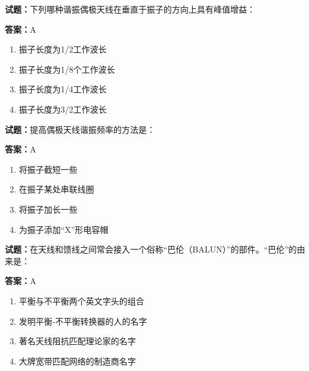 \documentclass{ctexbook}
\begin{document}




\vspace{1em}

\textbf{试题：}下列哪种谐振偶极天线在垂直于振子的方向上具有峰值增益： 

\textbf{答案：}A 

\begin{enumerate}[leftmargin=3em]
  \item 振子长度为1/2工作波长 

  \item 振子长度为1/8个工作波长 

  \item 振子长度为1/4工作波长 

  \item 振子长度为3/2工作波长 

\end{enumerate}





\vspace{1em}

\textbf{试题：}提高偶极天线谐振频率的方法是： 

\textbf{答案：}A 

\begin{enumerate}[leftmargin=3em]
  \item 将振子截短一些 

  \item 在振子某处串联线圈 

  \item 将振子加长一些 

  \item 为振子添加“X”形电容帽 

\end{enumerate}





\vspace{1em}

\textbf{试题：}在天线和馈线之间常会接入一个俗称“巴伦（BALUN）”的部件。“巴伦”的由来是： 

\textbf{答案：}A 

\begin{enumerate}[leftmargin=3em]
  \item 平衡与不平衡两个英文字头的组合 

  \item 发明平衡-不平衡转换器的人的名字 

  \item 著名天线阻抗匹配理论家的名字 

  \item 大牌宽带匹配网络的制造商名字 

\end{enumerate}
\end{document}
